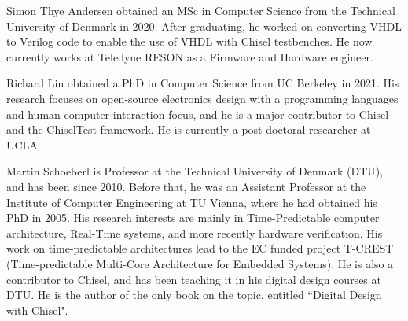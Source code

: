 \documentclass[conference]{IEEEtran}
\begin{document}
\begin{IEEEbiography}{Simon Thye Andersen}
  obtained an MSc in Computer Science from the Technical University of Denmark in 2020.
  After graduating, he worked on converting VHDL to Verilog code to enable the use of VHDL with Chisel testbenches.
  He now currently works at Teledyne RESON as a Firmware and Hardware engineer.
\end{IEEEbiography}

\begin{IEEEbiography}{Richard Lin}
obtained a PhD in Computer Science from UC Berkeley in 2021.  
His research focuses on open-source electronics design with a programming languages and human-computer interaction focus, and he is a major contributor to Chisel and the ChiselTest framework.
He is currently a post-doctoral researcher at UCLA.
\end{IEEEbiography}

\begin{IEEEbiography}{Martin Schoeberl}
  is Professor at the Technical University of Denmark (DTU), and has been since 2010.
  Before that, he was an Assistant Professor at the Institute of Computer Engineering at TU Vienna, where he had obtained his PhD in 2005.
  His research interests are mainly in Time-Predictable computer architecture, Real-Time systems, and more recently hardware verification.
  His work on time-predictable architectures lead to the EC funded project T-CREST (Time-predictable Multi-Core Architecture for Embedded Systems).
  He is also a contributor to Chisel, and has been teaching it in his digital design courses at DTU.
  He is the author of the only book on the topic, entitled ``Digital Design with Chisel".
\end{IEEEbiography}
\end{document}
